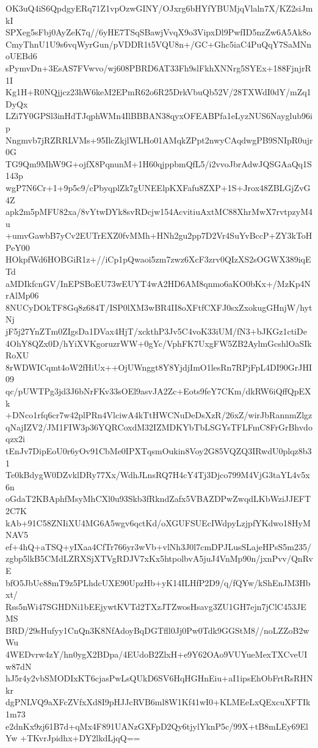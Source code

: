 OK3uQ4iS6QpdgyERq71Z1vpOzwGINY/OJxrg6bHYfYBUMjqVlaln7X/KZ2siJmkI
SPXeg5sFbj0AyZeK7q//6yHE7TSqSBawjVvqX9o3VipxDl9PwfID5nzZw6A5Ak8o
CmyThnU1U9s6vqWyrGun/pVDDR1t5VQU8n+/GC+Ghc5iaC4PuQqY7SaMNnoUEBd6
sPymvDn+3EsAS7FVwvo/wj608PBRD6AT33Fh9slFkhXNNrg5SYEx+188FjnjrR1I
Kg1H+R0NQjjcz23hW6keM2EPmR62o6R25DrkVbuQb52V/28TXWdI0dY/mZq1DyQx
LZi7Y0GPSl3inHdTJqphWMn4IlBBBAN38qyxOFEABPfa1eLyzNUS6Nayglub96ip
Nngmvb7jRZRRLVMs+95IlcZkjlWLHo01AMqkZPpt2nwyCAqdwgPB9SNIpR0ujr0G
TG9Qm9MhW9G+ojfX8PqnunM+1H60qjppbmQfL5/i2vvoJbrAdwJQSGAaQq1S143p
wgP7N6Cr+1+9p5c9/cPbyqplZk7gUNEElpKXFafu8ZXP+1S+Jrox48ZBLGjZvG4Z
apk2m5pMFU82xa/8vYtwDYk8svRDcjw154AcvitiuAxtMC88XhrMwX7rvtpzyM4u
+umvGawbB7yCv2EUTrEXZ0fvMMh+HNh2gu2pp7D2Vr4SuYvBccP+ZY3kToHPeY00
HOkpfWd6HOBGiR1z+//iCp1pQwaoi5zm7zwz6XcF3zrv0QIzXS2sOGWX389iqETd
aMDIkfcnGV/InEPSBoEU73wEUYT4wA2HD6AM8qnmo6aKO0bKx+/MzKp4NrAlMp06
8NUCyDOkTF8Gq8z684T/ISP0lXM3wBR4II8oXFtfCXFJ0sxZxokugGHnjW/hytNj
jF5j27YnZTm0ZIgsDa1DVax4HjT/xckthP3Jv5C4voK33iUM/fN3+bJKGz1ctiDe
4OhY8QZx0D/hYiXVKgoruzrWW+0gYc/VphFK7UxgFW5ZB2AylmGcshlOaSIkRoXU
8rWDWICqmt4oW2fHiUx++OjUWnggt8Y8YjdjImO1lesRn7RPjFpL4DI90GrJHI09
qc/pUWTPg3jd3J6bNrFKv33sOEl9asvJA2Zc+Eots9feY7CKm/dkRW6iQffQpEXk
+DNco1rfq6cr7w42plPRn4VlciwA4kTtHWCNuDeDsXzR/26xZ/wirJbRannmZlgz
qNajIZV2/JM1FIW3p36YQRCoxdM32IZMDKYbTbLSGYsTFLFmC8FrGrBhvdoqzx2i
tEnJv7DipEoU0r6yOv91CbMe0IPXTqsmOukin8Voy2G85VQZQ3IRwdU0plqz8b31
Te0kBdygW0DZvklDRy77Xx/WdhJLnsRQ7H4cY4Tj3Djco799M4VjG3taYL4v5x6n
oGdaT2KBAphfMsyMhCXl0u93Skb3fRkndZafx5VBAZDPwZwqdLKbWziJJEFT2C7K
kAb+91C58ZNIiXU4MG6A5wgv6qctKd/oXGUFSUEcIWdpyLzjpfYKdwo18HyMNAV5
ef+4hQ+aTSQ+yIXaa4CfTr766yr3wVb+vlNh3J0l7cmDPJLusSLajeHPsS5m235/
zgbp5lkB5CMdLZRXSjXTVgRDJV7xKx5htpolbvA5juJ4VnMp90n/jxnPvv/QnRvE
bfO5JbUc88mT9z5PLhdcUXE90UpzHb+yK14ILHfP2D9/q/fQYw/kShEnJM3Hbxt/
Rss5nWi47SGHDNi1bEEjywtKVTd2TXzJTZwosHsavg3ZU1GH7ejn7jClC453JEMS
BRD/29sHufyy1CnQn3K8NfAdoyBqDGTfll0Jj0Pw0Tdk9GGStM8//noLZZoB2wWu
4WEDvrw4zY/hn0ygX2BDpa/4EUdoB2ZlxH+e9Y62OAo9VUYueMexTXCveUIw87dN
hJ5r4y2vbSMODIxKT6cjasPwLsQUkD6SV6HqHGHnEiu+aI1ipsEhObFrtRsRHNkr
dgPNLVQ9aXFcZVfxXd8I9pHJJcRVB6ml8W1Kf41wI0+KLMEeLxQExcuXFTIk1m73
e2dnKx9zj61B7d+qMx4F891UANzGXFpD2Qy6tjylYknP5c/99X+tB8mLEy69ElYw
+TKvrJpidhx+DY2lkdLjqQ==
